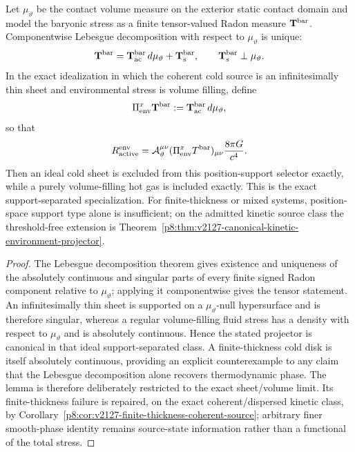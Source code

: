 \documentclass[12pt,a4paper]{article}
\begin{document}
\begin{lemma}
\label{p8:lem:source-environment-separation}
Let $\mu_\vartheta$ be the contact volume measure on the exterior static contact domain and model the baryonic stress as a finite tensor-valued Radon measure $\mathbf T^{\rm bar}$.  Componentwise Lebesgue decomposition with respect to $\mu_\vartheta$ is unique:
\begin{equation}
\label{p8:eq:baryon-source-env-decomposition}
\mathbf T^{\rm bar}
=\mathbf T_{\rm ac}^{\rm bar}\,d\mu_\vartheta+\mathbf T_{\rm s}^{\rm bar},
\qquad
\mathbf T_{\rm s}^{\rm bar}\perp\mu_\vartheta.
\end{equation}
In the exact idealization in which the coherent cold source is an infinitesimally thin sheet and environmental stress is volume filling, define
\begin{equation}
\label{p8:eq:Pi-env-stress-definition}
\Pi_{\rm env}^{x}\mathbf T^{\rm bar}:=\mathbf T_{\rm ac}^{\rm bar}\,d\mu_\vartheta,
\end{equation}
so that
\begin{equation}
\label{p8:eq:environmental-active-projection}
R_{\rm active}^{\rm env}
=\mathcal A_\vartheta^{\mu\nu}(\Pi_{\rm env}^{x}T^{\rm bar})_{\mu\nu}\frac{8\pi G}{c^4}.
\end{equation}
Then an ideal cold sheet is excluded from this position-support selector exactly, while a purely volume-filling hot gas is included exactly.  This is the exact support-separated specialization.  For finite-thickness or mixed systems, position-space support type alone is insufficient; on the admitted kinetic source class the threshold-free extension is Theorem~\ref{p8:thm:v2127-canonical-kinetic-environment-projector}.
\end{lemma}

\begin{proof}
The Lebesgue decomposition theorem gives existence and uniqueness of the absolutely continuous and singular parts of every finite signed Radon component relative to $\mu_\vartheta$; applying it componentwise gives the tensor statement.  An infinitesimally thin sheet is supported on a $\mu_\vartheta$-null hypersurface and is therefore singular, whereas a regular volume-filling fluid stress has a density with respect to $\mu_\vartheta$ and is absolutely continuous.  Hence the stated projector is canonical in that ideal support-separated class.  A finite-thickness cold disk is itself absolutely continuous, providing an explicit counterexample to any claim that the Lebesgue decomposition alone recovers thermodynamic phase.  The lemma is therefore deliberately restricted to the exact sheet/volume limit.  Its finite-thickness failure is repaired, on the exact coherent/dispersed kinetic class, by Corollary~\ref{p8:cor:v2127-finite-thickness-coherent-source}; arbitrary finer smooth-phase identity remains source-state information rather than a functional of the total stress.
\end{proof}
\end{document}
